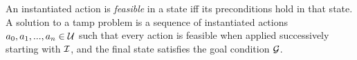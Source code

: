 An instantiated action is \emph{feasible} in a state iff
its preconditions hold in that state. A solution to a {\sc
  tamp} problem is a sequence of instantiated actions $a_{0}, a_{1},
..., a_{n} \in \mathcal{U}$ such that every action is feasible when applied
successively starting with $\mathcal{I}$, and the final state satisfies the
goal condition $\mathcal{G}$.







